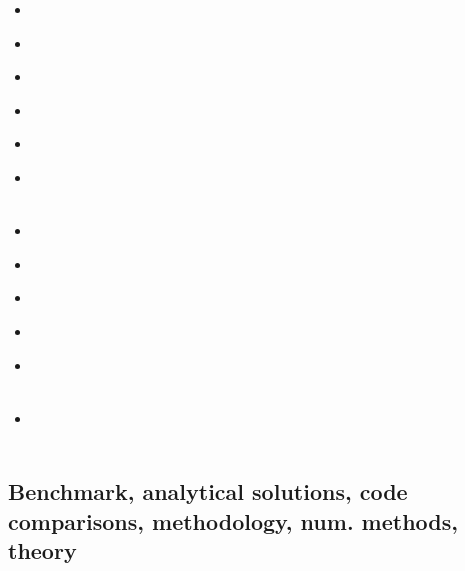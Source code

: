\begin{scriptsize}
\begin{itemize}
\item[\nineteeneightytwo] 
\textcite{crpi82} \\
\item[\nineteeneightynine] 
\textcite{ribe89} \\
\item[\nineteenninetythree]
\textcite{shem93} \\
\item[\twothousandtwo] 
\textcite{hube02b} \\
\item[\twothousandfive] 
\textcite{lahb05} \\
\item[\twothousandsix] 
\textcite{basv06} \\
\textcite{cuhy06} \\
\item[\twothousandten] 
\textcite{habl10} \\
\item[\twothousandthirteen] 
\textcite{namu13} \\
\textcite{gogu14}
\item[\twothousandseventeen] 
\textcite{babm17} \\
\item[\twothousandnineteen] 
\textcite{magn19} \\
\item[\twothousandtwentyone] 
\textcite{scvg21} \\
\textcite{erhf21} \\
\item[\twothousandtwentytwo] 
\textcite{scva22} \\
\textcite{shlz22} \\
\end{itemize}
\end{scriptsize}


\subsection{Benchmark, analytical solutions, code comparisons, methodology, num. methods, theory}

